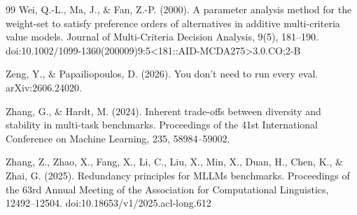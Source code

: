 \documentclass[11pt]{article}
\begin{document}
\begin{thebibliography}{99}
 Wei, Q.-L., Ma, J., \& Fan, Z.-P. (2000). A parameter analysis method for the weight-set to satisfy preference orders of alternatives in additive multi-criteria value models. Journal of Multi-Criteria Decision Analysis, 9(5), 181–190. doi:10.1002/1099-1360(200009)9:5<181::AID-MCDA275>3.0.CO;2-B

 Zeng, Y., \& Papailiopoulos, D. (2026). You don’t need to run every eval. arXiv:2606.24020.

 Zhang, G., \& Hardt, M. (2024). Inherent trade-offs between diversity and stability in multi-task benchmarks. Proceedings of the 41st International Conference on Machine Learning, 235, 58984–59002.

 Zhang, Z., Zhao, X., Fang, X., Li, C., Liu, X., Min, X., Duan, H., Chen, K., \& Zhai, G. (2025). Redundancy principles for MLLMs benchmarks. Proceedings of the 63rd Annual Meeting of the Association for Computational Linguistics, 12492–12504. doi:10.18653/v1/2025.acl-long.612

\end{thebibliography}
\end{document}
